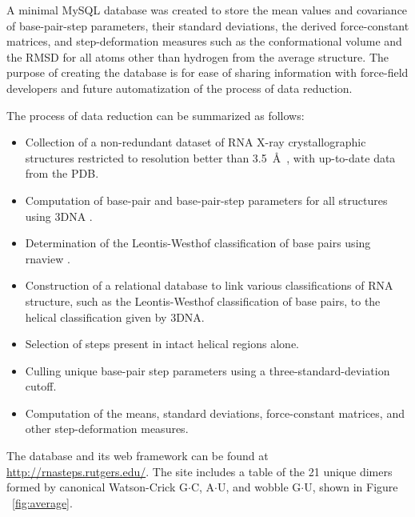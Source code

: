 A  minimal MySQL database  was created  to store  the mean  values and
covariance  of base-pair-step  parameters, their  standard deviations,
the  derived force-constant  matrices,  and step-deformation  measures
such as  the conformational  volume and the  RMSD for all  atoms other
than hydrogen from the average  structure. The purpose of creating the
database  is   for  ease  of  sharing   information  with  force-field
developers and future automatization of the process of data reduction.

The process of data reduction can be summarized as follows:
\begin{itemize}
\item{Collection   of   a   non-redundant   dataset   of   RNA   X-ray
crystallographic  structures  restricted  to resolution  better  than
3.5~\AA ~, with up-to-date data from the PDB.}
\item{Computation of  base-pair and base-pair-step  parameters for all
    structures using 3DNA \cite{lu2003}.}
\item{Determination   of   the   Leontis-Westhof   classification   of
base pairs using rnaview \cite{yang2003}.}
\item{Construction   of  a   relational  database   to   link  various
  classifications  of  RNA  structure,  such  as  the  Leontis-Westhof
  classification of base pairs, to the helical classification given by
  3DNA.}
\item{Selection of steps present in intact helical regions alone.}
\item{Culling    unique   base-pair    step    parameters   using    a
    three-standard-deviation cutoff.}
\item{Computation  of the  means, standard  deviations, force-constant
matrices, and other step-deformation measures.}
\end{itemize}  

The database and its web framework can be found at
\url{http://rnasteps.rutgers.edu/}.  The site  includes a  table of
the  21  unique dimers  formed  by  canonical Watson-Crick  G$\cdot$C,
A$\cdot$U, and wobble G$\cdot$U, shown in Figure ~\ref{fig:average}.

